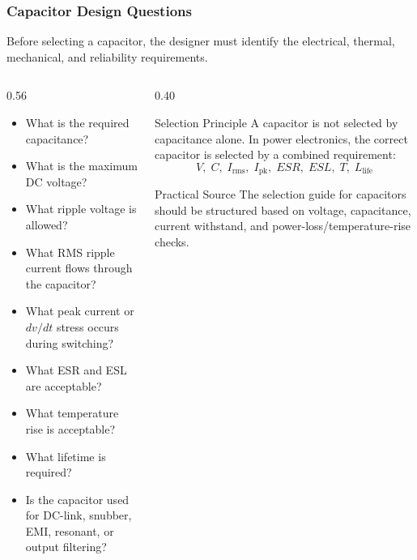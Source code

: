 \begin{frame}
\frametitle{Capacitor Design Questions}
Before selecting a capacitor, the designer must identify the electrical, thermal, mechanical, and reliability requirements.
\begin{columns}
\begin{column}{0.56\textwidth}
\begin{itemize}
    \item What is the required capacitance?
    \item What is the maximum DC voltage?
    \item What ripple voltage is allowed?
    \item What RMS ripple current flows through the capacitor?
    \item What peak current or $dv/dt$ stress occurs during switching?
    \item What ESR and ESL are acceptable?
    \item What temperature rise is acceptable?
    \item What lifetime is required?
    \item Is the capacitor used for DC-link, snubber, EMI, resonant, or output filtering?
\end{itemize}

\end{column}

\begin{column}{0.40\textwidth}
\begin{block}{Selection Principle}
\small
A capacitor is not selected by capacitance alone. In power electronics, the correct capacitor is selected by a combined requirement:
\[
V,\; C,\; I_{\mathrm{rms}},\; I_{\mathrm{pk}},\; ESR,\; ESL,\; T,\; L_{\mathrm{life}}
\]
\end{block}

\begin{block}{Practical Source}
\small
The selection guide for capacitors should be structured based on voltage, capacitance, current withstand, and power-loss/temperature-rise checks.
\end{block}
\end{column}
\end{columns}

\end{frame}


